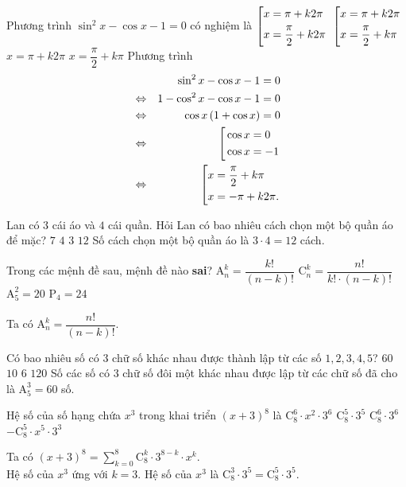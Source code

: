 \begin{ex}%
	Phương trình $\sin^2x-\cos x -1=0$ có nghiệm là
		\choice
	{$\left[\begin{aligned}& x=\pi+k2\pi\\& x=\dfrac{\pi}{2}+k2\pi\end{aligned}\right.$}
	{\True $\left[\begin{aligned}& x=\pi+k2\pi\\& x=\dfrac{\pi}{2}+k\pi\end{aligned}\right.$}
	{$x=\pi+k2\pi$}
	{$x=\dfrac{\pi}{2}+k\pi$}
	\loigiai
	{ Phương trình
		\begin{eqnarray*}
		&& \sin^2x-\cos x -1=0\\
		& \Leftrightarrow & 1-\cos^2x-\cos x-1=0\\
		& \Leftrightarrow & \cos x \left( 1+\cos x\right)=0\\
		& \Leftrightarrow & \left[\begin{aligned}& \cos x=0\\& \cos x=-1\end{aligned}\right.\\
		& \Leftrightarrow & \left[\begin{aligned}&x= \dfrac{\pi}{2}+k \pi \\& x=-\pi +k 2\pi.\end{aligned}\right.
		\end{eqnarray*}
	}
\end{ex}

\begin{ex}%
	Lan có $3$ cái áo và $4$ cái quần. Hỏi Lan có bao nhiêu cách chọn một bộ quần áo để mặc?
		\choice
	{$7$}
	{$4$}
	{$3$}
	{\True $12$}
	\loigiai
	{ Số cách chọn một bộ quần áo là $3\cdot 4 =12$ cách.
	}
\end{ex}

\begin{ex}%
	Trong các mệnh đề sau, mệnh đề nào {\bf {sai}}?
		\choice
	{\True $\mathrm{A}_n^k=\dfrac{k!}{(n-k)!}$}
	{$\mathrm{C}_n^k=\dfrac{n!}{k!\cdot (n-k)!}$}
	{$\mathrm{A}_5^2=20$}
	{$\mathrm{P}_4=24$}
	\loigiai
	{ Ta có $\mathrm{A}_n^k=\dfrac{n!}{(n-k)!}.$
		
	}
\end{ex}

\begin{ex}%
	Có bao nhiêu số có $3$ chữ số khác nhau được thành lập từ các số $1,2,3,4,5$?
		\choice
	{\True $60$}
	{$10$}
	{$6$}
	{$120$}
	\loigiai
	{ Số các số có $3$ chữ số đôi một khác nhau được lập từ các chữ số đã cho là $\mathrm{A}_5^3=60$ số.
	}
\end{ex}

\begin{ex}%
	Hệ số của số hạng chứa $x^3$ trong khai triển $(x+3)^8$ là
		\choice
	{$\mathrm{C}_8^6\cdot x^2\cdot 3^6$}
	{\True $\mathrm{C}_8^5\cdot 3^5$}
	{$\mathrm{C}_8^6\cdot 3^6$}
	{$-\mathrm{C}_8^5\cdot x^5 \cdot 3^3$}
	\loigiai
	{ Ta có $(x+3)^8=\sum\limits_{k=0}^8 \mathrm{C}_8^k\cdot 3^{8-k}\cdot x^k.$ \\
		Hệ số của $x^3$ ứng với $k=3$.
		Hệ số của $x^3$ là $\mathrm{C}_8^3\cdot 3^5=\mathrm{C}_8^5\cdot 3^5$.
		
	}
\end{ex}

